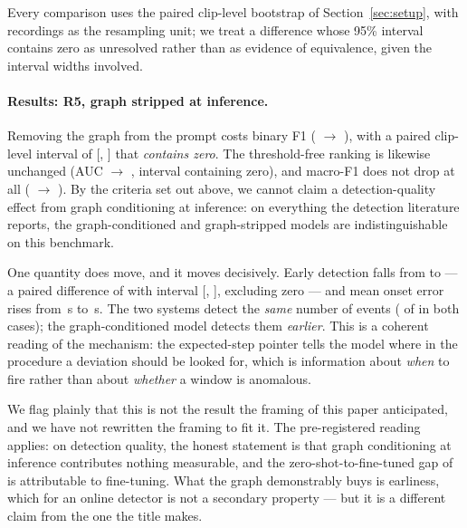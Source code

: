 \documentclass[10pt,twocolumn]{article}
\begin{document}
Every comparison uses the paired clip-level bootstrap of
Section~\ref{sec:setup}, with recordings as the resampling unit; we treat a
difference whose 95\% interval contains zero as unresolved rather than as
evidence of equivalence, given the interval widths involved.

\paragraph{Results: R5, graph stripped at inference.}
Removing the graph from the prompt costs \ngDelta{} binary F1 (\resF{} $\to$
\ngF{}), with a paired clip-level interval of [\ngDeltaLo{}, \ngDeltaHi{}] that
\emph{contains zero}. The threshold-free ranking is likewise unchanged (AUC
\resAUC{} $\to$ \ngAUC{}, interval containing zero), and macro-F1 does not drop
at all (\resMacro{} $\to$ \ngMacro{}). By the criteria set out above, we cannot
claim a detection-quality effect from graph conditioning at inference: on
everything the detection literature reports, the graph-conditioned and
graph-stripped models are indistinguishable on this benchmark.

One quantity does move, and it moves decisively. Early detection falls from
\resEDS{} to \ngEDS{} --- a paired difference of \ngEdsDelta{} with interval
[\ngEdsLo{}, \ngEdsHi{}], excluding zero --- and mean onset error rises from
\resMAE{}\,s to \ngMAE{}\,s. The two systems detect the \emph{same} number of
events (\resDet{} of \resLoc{} in both cases); the graph-conditioned model
detects them \emph{earlier}. This is a coherent reading of the mechanism: the
expected-step pointer tells the model where in the procedure a deviation should
be looked for, which is information about \emph{when} to fire rather than about
\emph{whether} a window is anomalous.

We flag plainly that this is not the result the framing of this paper
anticipated, and we have not rewritten the framing to fit it. The pre-registered
reading applies: on detection quality, the honest statement is that
graph conditioning at inference contributes nothing measurable, and the
zero-shot-to-fine-tuned gap of \resDelta{} is attributable to fine-tuning. What
the graph demonstrably buys is earliness, which for an online detector is not a
secondary property --- but it is a different claim from the one the title makes.
\end{document}
